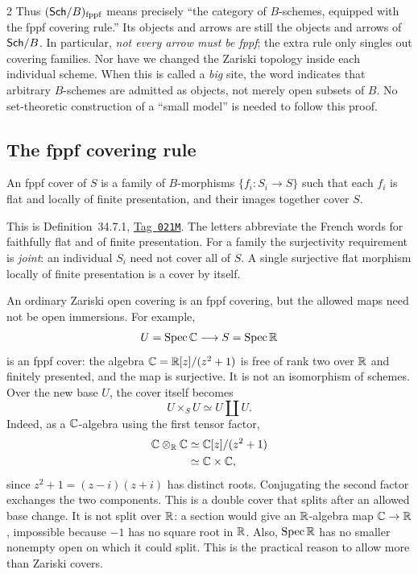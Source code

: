 \documentclass[12pt]{memoir}
\newcommand{\BGtag}[1]{\href{https://stacks.math.columbia.edu/tag/#1}{Tag~\texttt{#1}}}
\begin{document}
\begin{multicols}{2}
Thus $(\mathsf{Sch}/B)_{\mathrm{fppf}}$ means precisely ``the category of
$B$-schemes, equipped with the fppf covering rule.'' Its objects and
arrows are still the objects and arrows of $\mathsf{Sch}/B$. In particular,
\emph{not every arrow must be fppf}; the extra rule only singles out
covering families. Nor have we changed the Zariski topology inside
each individual scheme. When this is called a \emph{big} site, the
word indicates that arbitrary $B$-schemes are admitted as objects,
not merely open subsets of $B$. No set-theoretic construction of a
``small model'' is needed to follow this proof.

\subsection{The fppf covering rule}
\begin{Def}\label{def:fppf}
An fppf cover of $S$ is a family of $B$-morphisms $\{f_i:S_i\to S\}$
such that each $f_i$ is flat and locally of finite presentation, and
their images together cover $S$.
\end{Def}
This is Definition~34.7.1, \BGtag{021M}. The letters abbreviate the
French words for faithfully flat and of finite presentation. For a
family the surjectivity requirement is \emph{joint}: an individual
$S_i$ need not cover all of $S$. A single surjective flat morphism
locally of finite presentation is a cover by itself.

An ordinary Zariski open covering is an fppf covering, but the allowed
maps need not be open immersions. For example,
\[
 U=\operatorname{Spec}\mathbb{C}\longrightarrow S=\operatorname{Spec}\mathbb{R}
\]
is an fppf cover: the algebra $\mathbb{C}=\mathbb{R}[z]/(z^2+1)$ is free of rank
two over $\mathbb{R}$ and finitely presented, and the map is surjective.
It is not an isomorphism of schemes. Over the new base $U$, the cover
itself becomes
\[
 U\times_S U\simeq U\amalg U.
\]
Indeed, as a $\mathbb{C}$-algebra using the first tensor factor,
\[
\begin{aligned}
\mathbb{C}\otimes_{\mathbb{R}}\mathbb{C}
 &\simeq\mathbb{C}[z]/(z^2+1)\\
 &\simeq\mathbb{C}\times\mathbb{C},
\end{aligned}
\]
since $z^2+1=(z-i)(z+i)$ has distinct roots. Conjugating the second
factor exchanges the two components. This is a double cover that
splits after an allowed base change. It is not split over $\mathbb{R}$:
a section would give an $\mathbb{R}$-algebra map $\mathbb{C}\to\mathbb{R}$, impossible
because $-1$ has no square root in $\mathbb{R}$. Also, $\operatorname{Spec}\mathbb{R}$ has no
smaller nonempty open on which it could split. This is the practical
reason to allow more than Zariski covers.


\end{multicols}
\end{document}

